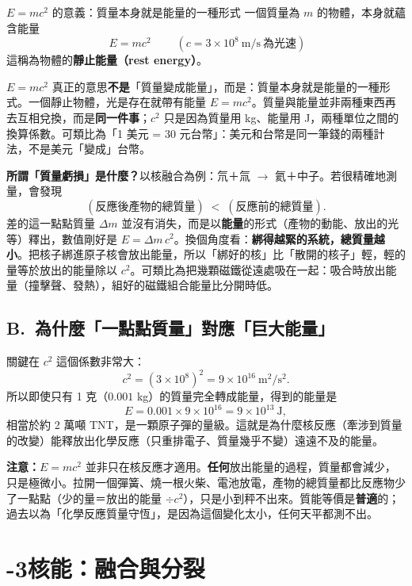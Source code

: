 \documentclass[11pt]{article}
\begin{document}
\begin{補充框}{$E=mc^2$ 的意義：質量本身就是能量的一種形式}
一個質量為 $m$ 的物體，本身就蘊含能量
$$\boxed{\;E = mc^2\;}\qquad(c=3\times10^8\ \text{m/s}\ \text{為光速})$$
這稱為物體的\textbf{靜止能量（rest energy）}。

$E=mc^2$ 真正的意思\textbf{不是}「質量變成能量」，而是：質量本身就是能量的一種形式。一個靜止物體，光是存在就帶有能量 $E=mc^2$。質量與能量並非兩種東西再去互相兌換，而是\textbf{同一件事}；$c^2$ 只是因為質量用 kg、能量用 J，兩種單位之間的換算係數。可類比為「1 美元 = 30 元台幣」：美元和台幣是同一筆錢的兩種計法，不是美元「變成」台幣。

\textbf{所謂「質量虧損」是什麼？}以核融合為例：氘＋氚 $\rightarrow$ 氦＋中子。若很精確地測量，會發現
$$(\text{反應後產物的總質量})\;<\;(\text{反應前的總質量}).$$
差的這一點點質量 $\Delta m$ 並沒有消失，而是以\textbf{能量}的形式（產物的動能、放出的光等）釋出，數值剛好是 $E=\Delta m\,c^2$。換個角度看：\textbf{綁得越緊的系統，總質量越小}。把核子綁進原子核會放出能量，所以「綁好的核」比「散開的核子」輕，輕的量等於放出的能量除以 $c^2$。可類比為把幾顆磁鐵從遠處吸在一起：吸合時放出能量（撞擊聲、發熱），組好的磁鐵組合能量比分開時低。
\end{補充框}


\subsection*{\sffamily B.\ 為什麼「一點點質量」對應「巨大能量」}

關鍵在 $c^2$ 這個係數非常大：
$$c^2=(3\times10^8)^2=9\times10^{16}\ \text{m}^2/\text{s}^2.$$
所以即使只有 1 克（$0.001$ kg）的質量完全轉成能量，得到的能量是
$$E=0.001\times9\times10^{16}=9\times10^{13}\ \text{J},$$
相當於約 2 萬噸 TNT，是一顆原子彈的量級。這就是為什麼核反應（牽涉到質量的改變）能釋放出化學反應（只重排電子、質量幾乎不變）遠遠不及的能量。

\textbf{注意：}$E=mc^2$ 並非只在核反應才適用。\textbf{任何}放出能量的過程，質量都會減少，只是極微小。拉開一個彈簧、燒一根火柴、電池放電，產物的總質量都比反應物少了一點點（少的量＝放出的能量 $\div c^2$），只是小到秤不出來。質能等價是\textbf{普適}的；過去以為「化學反應質量守恆」，是因為這個變化太小，任何天平都測不出。

\section*{-3\quad 核能：融合與分裂}
\end{document}
